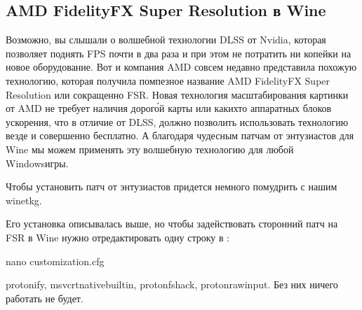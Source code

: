 \documentclass[letterpaper,10pt,russian,openany]{sphinxmanual}
\begin{document}
\ignorespaces 

\subsection{AMD FidelityFX Super Resolution в Wine}
\label{\detokenize{source/linux-gaming:amd-fidelityfx-super-resolution-wine}}\label{\detokenize{source/linux-gaming:amd-fsr}}\label{\detokenize{source/linux-gaming:index-16}}
\sphinxAtStartPar
Возможно, вы слышали о волшебной технологии DLSS от Nvidia, которая позволяет поднять FPS почти в два раза и при этом не потратить ни копейки на новое оборудование.
Вот и компания AMD совсем недавно представила похожую технологию, которая получила помпезное название AMD FidelityFX Super Resolution или сокращенно FSR.
Новая технология масштабирования картинки от AMD не требует наличия дорого́й карты или каких\sphinxhyphen{}то аппаратных блоков ускорения,
что в отличие от DLSS, должно позволить использовать технологию везде и совершенно бесплатно.
А благодаря чудесным патчам от энтузиастов для Wine мы можем применять эту волшебную технологию для любой Windows\sphinxhyphen{}игры.

\sphinxAtStartPar
{}

\sphinxAtStartPar
Чтобы установить патч от энтузиастов придется немного помудрить с нашим wine\sphinxhyphen{}tkg.

\sphinxAtStartPar
Его установка описывалась выше, но чтобы задействовать сторонний патч на FSR в Wine нужно отредактировать одну строку в :

\begin{sphinxVerbatim}[commandchars=\\\{\}]
nano customization.cfg



\PYGZus{}protonify, \PYGZus{}msvcrt\PYGZus{}nativebuiltin, \PYGZus{}proton\PYGZus{}fs\PYGZus{}hack, \PYGZus{}proton\PYGZus{}rawinput.
Без них ничего работать не будет.
\end{sphinxVerbatim}
\end{document}
